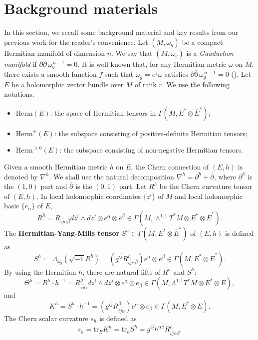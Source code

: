 \documentclass[12pt, reqno]{amsart}
\newcommand\bp{{\bar\partial}}
\theoremstyle{plain}
\theoremstyle{definition}
\newcommand{\p}{\partial}
\renewcommand{\bar}{\overline}
\newcommand{\beq}{\begin{equation}}
\newcommand{\eeq}{\end{equation}}
\renewcommand{\bp}{\bar{\partial}}
\newcommand{\ts}{\otimes}
\renewcommand{\>}{\rightarrow}
\renewcommand{\>}{\rightarrow}
\renewcommand{\p}{{\partial}}
\renewcommand{\bp}{{\bar{\partial}}}
\renewcommand{\bar}{\overline}
\newcommand{\smo}{\sqrt{-1}}
\newcommand{\Herm}{\mathrm{Herm}}
\numberwithin{equation}{section} %
\begin{document}
\section{Background materials}

In this section, we recall some background material and key results from our previous work \cite{XYY26+} for the reader's convenience.
Let $(M,\omega_g)$ be a compact Hermitian manifold of dimension $n$.
We say that $(M,\omega_g)$ is a \emph{Gauduchon manifold} if
$
\partial\bar{\partial}\,\omega_g^{\,n-1}=0.
$
It is well known that, for any Hermitian metric $\omega$ on $M$,
there exists a smooth function $f$ such that
$
\omega_g = e^{f}\omega
$
satisfies $\partial\bar{\partial}\,\omega_g^{\,n-1}=0$ (\cite{Gau84}). Let $E$ be a holomorphic vector bundle over $M$ of rank $r$. We use the following notations:

\begin{itemize}
    \item $\mathrm{Herm}(E)$: the space of Hermitian tensors in
    $\Gamma(M, E^*\otimes \bar{E}^*)$;

    \item $\Herm^+(E)$: the subspace consisting of
    positive-definite Hermitian tensors;

    \item $\Herm^{\ge 0}(E)$: the subspace consisting of
    non-negative Hermitian tensors.
\end{itemize}
Given a smooth Hermitian metric $h$ on $E$, the Chern connection of
$(E,h)$ is denoted by $\nabla^{h}$. We shall use the natural
decomposition $ \nabla^{h}=\p^{h}+\bp$, where $\p^{h}$ is the
$(1,0)$ part and $\bp$ is the $(0,1)$ part. Let $R^{h}$ be the Chern
curvature tensor of $(E,h)$. In local holomorphic coordinates
$\{z^i\}$ of $M$ and local holomorphic basis $\{e_\alpha\}$ of $E$,
\beq R^h=R_{i\bar j\alpha\bar\beta}dz^i\wedge d\bar z^j\ts
e^\alpha\ts\bar{e}^\beta \in\Gamma\left(M,\wedge^{1,1}T^*M\ts
E^*\ts\bar{E}^*\right). \eeq  The \textbf{Hermitian-Yang-Mills tensor} $ S^{h}\in
\Gamma(M,E^*\ts \bar E^*)$ of $(E,h)$  is defined as \beq S^{h}
:=\Lambda_{\omega_g}\left(\smo R^{h}\right)=\left(g^{i\bar
    j}R^{h}_{i\bar j\alpha\bar\beta}\right) e^\alpha\ts \bar e^\beta \in
\Gamma(M,E^*\ts \bar E^*).
\eeq  By using the Hermitian $h$, there
are natural lifts of $R^h$ and $S^h$: \beq\Theta^h=R^h\cdot
h^{-1}=R_{i\bar j\alpha}^{\beta}dz^i\wedge d\bar z^j\ts
e^\alpha\ts{e}_\beta\in \Gamma(M,\Lambda^{1,1}T^*M\ts E^*\ts E),\eeq
and \beq   K^h=S^h\cdot h^{-1}=\left(g^{i\bar j}R_{i\bar
    j\alpha}^{\beta}\right) e^\alpha\ts  e_\beta\in \Gamma(M,E^*\ts E).
\eeq
The Chern scalar curvature $s_h$ is defined as
\beq s_h=\mathrm{tr}_E K^h=\mathrm{tr}_h S^h=g^{i\bar j}h^{\alpha\bar\beta}R_{i\bar j \alpha\bar\beta}^h.\eeq
\end{document}

